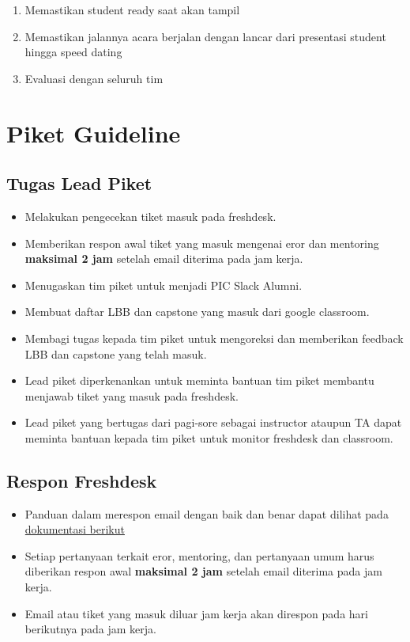 \documentclass[
]{book}
\providecommand{\tightlist}{%
  \setlength{\itemsep}{0pt}\setlength{\parskip}{0pt}}
\begin{document}
\begin{enumerate}
\def\labelenumi{\arabic{enumi}.}
\tightlist
\item
  Memastikan student ready saat akan tampil
\item
  Memastikan jalannya acara berjalan dengan lancar dari presentasi student hingga speed dating
\item
  Evaluasi dengan seluruh tim
\end{enumerate}

\hypertarget{piket-guideline}{%
\chapter{Piket Guideline}\label{piket-guideline}}

\hypertarget{tugas-lead-piket}{%
\section{Tugas Lead Piket}\label{tugas-lead-piket}}

\begin{itemize}
\tightlist
\item
  Melakukan pengecekan tiket masuk pada freshdesk.
\item
  Memberikan respon awal tiket yang masuk mengenai eror dan mentoring \textbf{maksimal 2 jam} setelah email diterima pada jam kerja.
\item
  Menugaskan tim piket untuk menjadi PIC Slack Alumni.
\item
  Membuat daftar LBB dan capstone yang masuk dari google classroom.
\item
  Membagi tugas kepada tim piket untuk mengoreksi dan memberikan feedback LBB dan capstone yang telah masuk.
\item
  Lead piket diperkenankan untuk meminta bantuan tim piket membantu menjawab tiket yang masuk pada freshdesk.
\item
  Lead piket yang bertugas dari pagi-sore sebagai instructor ataupun TA dapat meminta bantuan kepada tim piket untuk monitor freshdesk dan classroom.
\end{itemize}

\hypertarget{respon-freshdesk}{%
\section{Respon Freshdesk}\label{respon-freshdesk}}

\begin{itemize}
\tightlist
\item
  Panduan dalam merespon email dengan baik dan benar dapat dilihat pada \href{https://trello-attachments.s3.amazonaws.com/5b178a5917d78094e809e4c9/5f69df1f8aa3e54171468888/de3bd28e0177e532a9de032b35310397/guidelines_(5).html}{dokumentasi berikut}
\item
  Setiap pertanyaan terkait eror, mentoring, dan pertanyaan umum harus diberikan respon awal \textbf{maksimal 2 jam} setelah email diterima pada jam kerja.
\item
  Email atau tiket yang masuk diluar jam kerja akan direspon pada hari berikutnya pada jam kerja.
\end{itemize}
\end{document}
